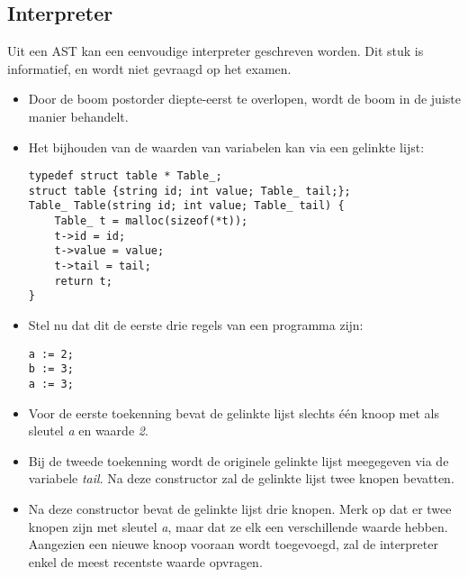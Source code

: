 \begin{enumerate}
\subsection{Interpreter}
Uit een AST kan een eenvoudige interpreter geschreven worden. Dit stuk is informatief, en wordt niet gevraagd op het examen.
\begin{itemize}
	\item Door de boom postorder diepte-eerst te overlopen, wordt de boom in de juiste manier behandelt.
	\item Het bijhouden van de waarden van variabelen kan via een gelinkte lijst:
	\begin{lstlisting}
typedef struct table * Table_;
struct table {string id; int value; Table_ tail;};
Table_ Table(string id; int value; Table_ tail) {
	Table_ t = malloc(sizeof(*t));
	t->id = id;
	t->value = value;
	t->tail = tail;
	return t;
}
	\end{lstlisting}
	\item Stel nu dat dit de eerste drie regels van een programma zijn:
	\begin{lstlisting}
a := 2;
b := 3;
a := 3;
	\end{lstlisting}
	\item Voor de eerste toekenning bevat de gelinkte lijst slechts één knoop met als sleutel \textit{a} en waarde \textit{2}. 
	\item Bij de tweede toekenning wordt de originele gelinkte lijst meegegeven via de variabele \textit{tail}. Na deze constructor zal de gelinkte lijst twee knopen bevatten.
	\item Na deze constructor bevat de gelinkte lijst drie knopen. Merk op dat er twee knopen zijn met sleutel \textit{a}, maar dat ze elk een verschillende waarde hebben. Aangezien een nieuwe knoop vooraan wordt toegevoegd, zal de interpreter enkel de meest recentste waarde opvragen.
\end{itemize}

\end{enumerate}


